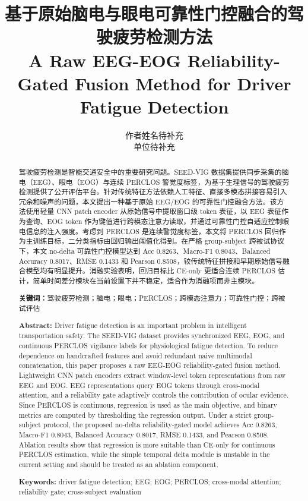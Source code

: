 \documentclass[UTF8,a4paper,10.5pt,fontset=windows]{ctexart}
\title{\textbf{基于原始脑电与眼电可靠性门控融合的驾驶疲劳检测方法}\\[3pt]
\large A Raw EEG-EOG Reliability-Gated Fusion Method for Driver Fatigue Detection}
\author{作者姓名待补充\\单位待补充}
\date{}
\begin{document}
\maketitle

\begin{abstract}
驾驶疲劳检测是智能交通安全中的重要研究问题。SEED-VIG 数据集提供同步采集的脑电（EEG）、眼电（EOG）与连续 PERCLOS 警觉度标签，为基于生理信号的驾驶疲劳检测提供了公开评估平台。针对传统特征方法依赖人工特征、直接多模态拼接容易引入冗余和噪声的问题，本文提出一种基于原始 EEG/EOG 的可靠性门控融合方法。该方法使用轻量 CNN patch encoder 从原始信号中提取窗口级 token 表征，以 EEG 表征作为查询、EOG token 作为键值进行跨模态注意力读取，并通过可靠性门控自适应控制眼电信息的注入强度。考虑到 PERCLOS 是连续警觉度标签，本文将 PERCLOS 回归作为主训练目标，二分类指标由回归输出阈值化得到。在严格 group-subject 跨被试协议下，本文 no-delta 可靠性门控模型达到 Acc 0.8263、Macro-F1 0.8043、Balanced Accuracy 0.8017、RMSE 0.1433 和 Pearson 0.8508，较传统特征拼接和早期原始信号融合模型均有明显提升。消融实验表明，回归目标比 CE-only 更适合连续 PERCLOS 估计，简单时间差分模块在当前设置下并不稳定，适合作为消融项而非主模块。

\noindent\textbf{关键词：}驾驶疲劳检测；脑电；眼电；PERCLOS；跨模态注意力；可靠性门控；跨被试评估
\end{abstract}

\begin{abstract}
\noindent\textbf{Abstract:} Driver fatigue detection is an important problem in intelligent transportation safety. The SEED-VIG dataset provides synchronized EEG, EOG, and continuous PERCLOS vigilance labels for physiological fatigue detection. To reduce dependence on handcrafted features and avoid redundant naive multimodal concatenation, this paper proposes a raw EEG-EOG reliability-gated fusion method. Lightweight CNN patch encoders extract window-level token representations from raw EEG and EOG. EEG representations query EOG tokens through cross-modal attention, and a reliability gate adaptively controls the contribution of ocular evidence. Since PERCLOS is continuous, regression is used as the main objective, and binary metrics are computed by thresholding the regression output. Under a strict group-subject protocol, the proposed no-delta reliability-gated model achieves Acc 0.8263, Macro-F1 0.8043, Balanced Accuracy 0.8017, RMSE 0.1433, and Pearson 0.8508. Ablation results show that regression is more suitable than CE-only for continuous PERCLOS estimation, while the simple temporal delta module is unstable in the current setting and should be treated as an ablation component.

\noindent\textbf{Keywords:} driver fatigue detection; EEG; EOG; PERCLOS; cross-modal attention; reliability gate; cross-subject evaluation
\end{abstract}
\end{document}
